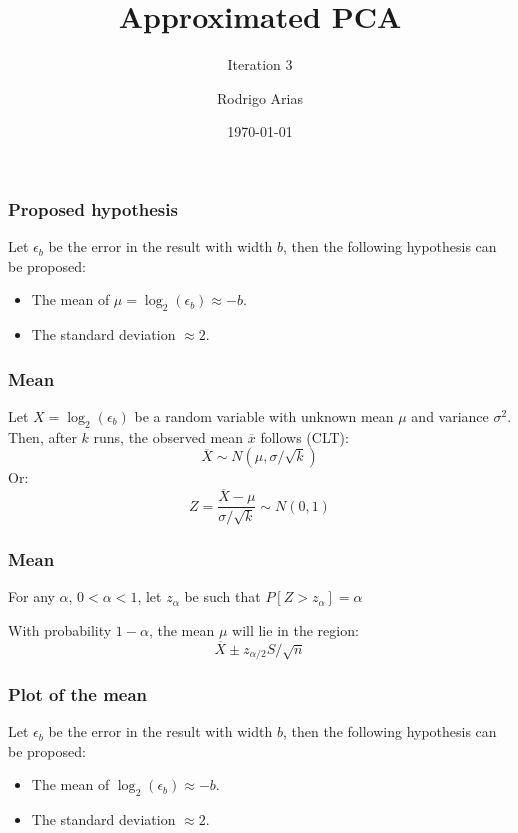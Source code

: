 \documentclass[serif, 12pt]{beamer}
\title{Approximated PCA}
\subtitle{Iteration 3}
\author{Rodrigo Arias} %
\date{\today} %
\begin{document}
\begin{frame}
	\titlepage
\end{frame}


\begin{frame}

\frametitle{Proposed hypothesis}

Let $\epsilon_b$ be the error in the result with width $b$, then the following 
hypothesis can be proposed:
\begin{itemize}
\item The mean of $\mu = \log_2(\epsilon_b) \approx -b$.
\item The standard deviation $\approx 2$.
\end{itemize}

\end{frame}


\begin{frame}
\frametitle{Mean}
Let $X = \log_2(\epsilon_b)$ be a random variable with unknown mean $\mu$ and 
variance $\sigma^2$.  Then, after $k$ runs, the observed mean $\overline x$ 
follows (CLT):
%
$$ \overline X \sim N(\mu,\sigma/\sqrt k)$$
%
Or:
%
$$ Z = \frac{\overline X - \mu}{\sigma/\sqrt{k}} \sim N(0, 1)$$
\end{frame}


\begin{frame}
\frametitle{Mean}
For any $\alpha$, $0 < \alpha < 1$, let $z_\alpha$ be such that $P[Z>z_\alpha] = 
\alpha$

With probability $1-\alpha$, the mean $\mu$ will lie in the region:
%
$$\overline X \pm z_{\alpha/2}S/\sqrt{n}$$
\end{frame}


\begin{frame}

\frametitle{Plot of the mean}

Let $\epsilon_b$ be the error in the result with width $b$, then the following 
hypothesis can be proposed:
\begin{itemize}
\item The mean of $\log_2(\epsilon_b) \approx -b$.
\item The standard deviation $\approx 2$.
\end{itemize}

\end{frame}

\end{document}
